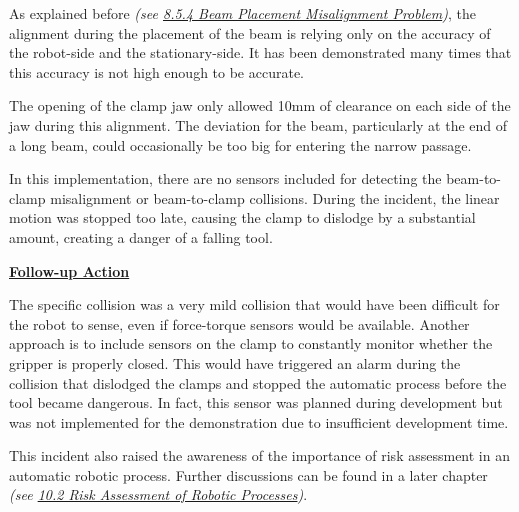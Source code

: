As explained before \textit{(see \uline{8.5.4 Beam Placement Misalignment Problem})}, the alignment during the placement of the beam is relying only on the accuracy of the robot-side and the stationary-side. It has been demonstrated many times that this accuracy is not high enough to be accurate. 

The opening of the clamp jaw only allowed 10mm of clearance on each side of the jaw during this alignment. The deviation for the beam, particularly at the end of a long beam, could occasionally be too big for entering the narrow passage.

In this implementation, there are no sensors included for detecting the beam-to-clamp misalignment or beam-to-clamp collisions. During the incident, the linear motion was stopped too late, causing the clamp to dislodge by a substantial amount, creating a danger of a falling tool.

\textbf{\uline{Follow-up Action}}

The specific collision was a very mild collision that would have been difficult for the robot to sense, even if force-torque sensors would be available. Another approach is to include sensors on the clamp to constantly monitor whether the gripper is properly closed. This would have triggered an alarm during the collision that dislodged the clamps and stopped the automatic process before the tool became dangerous. In fact, this sensor was planned during development but was not implemented for the demonstration due to insufficient development time. 

This incident also raised the awareness of the importance of risk assessment in an automatic robotic process. Further discussions can be found in a later chapter \textit{(see \uline{10.2 Risk Assessment of Robotic Processes})}.


